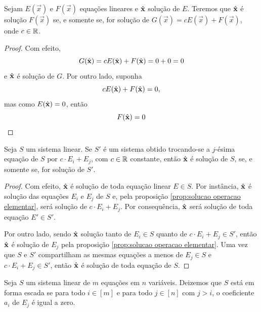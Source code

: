 \begin{prop:solucao operacao elementar}
\label{prop:solucao operacao elementar}
Sejam $E(\vec x)$ e $F(\vec x)$ equações lineares e $\hat{\mathbf{x}}$ solução de $E$.
Teremos que $\hat{\mathbf{x}}$ é solução $F(\vec x)$ se, e somente se, for solução de
$G(\vec x) = cE(\vec x) + F(\vec x)$, onde $c \in \mathbb{R}$.
\end{prop:solucao operacao elementar}
\begin{proof}
	Com efeito,
	\[
		G(\hat{\mathbf{x}}) = c E(\hat{\mathbf{x}}) + F(\hat{\mathbf{x}}) = 0 + 0 = 0
	\]
	e $\hat{\mathbf{x}}$ é solução de $G$.
	Por outro lado, suponha
	\[
		c E(\hat{\mathbf{x}}) + F(\hat{\mathbf{x}}) = 0,
	\]
	mas como $E(\hat{\mathbf{x}}) = 0$, então
	\[
		F(\hat{\mathbf{x}}) = 0
	\]
\end{proof}

\begin{cor:sistema equivalente}
Seja $S$ um sistema linear.
Se $S'$ é um sistema obtido trocando-se a $j$-ésima equação de $S$ por
$c \cdot E_i + E_j$, com $c \in \mathbb{R}$ constante, então $\hat{\mathbf{x}}$ é solução de $S$,
se, e somente se, for solução de $S'$.
\end{cor:sistema equivalente}
\begin{proof}
	Com efeito, $\hat{\mathbf{x}}$ é solução de toda equação linear $E \in S$.
	Por instância, $\hat{\mathbf{x}}$ é solução das equações $E_i$ e $E_j$ de $S$ e, pela
	proposição \ref{prop:solucao operacao elementar}, será solução de $c \cdot E_i + E_j$.
	Por consequência, $\hat{\mathbf{x}}$ será solução de toda equação $E' \in S'$.

	Por outro lado, sendo $\hat{\mathbf{x}}$ solução tanto de $E_i \in S$ quanto de
	$c \cdot E_i + E_j \in S'$, então $\hat{\mathbf{x}}$ é solução de $E_j$ pela
	proposição \ref{prop:solucao operacao elementar}.
	Uma vez que $S$ e $S'$ compartilham as mesmas equações a menos de $E_j \in S$ e
	$c \cdot E_i + E_j \in S'$, então $\hat{\mathbf{x}}$ é solução de toda equação de $S$.
\end{proof}

\begin{def:forma escada}
Seja $S$ um sistema linear de $m$ equações em $n$ variáveis.
Deizemos que $S$ está em forma escada se para todo $i \in [m]$ e para todo $j \in [n]$ com
$j > i$, o coeficiente $a_i$ de $E_j$ é igual a zero.
\end{def:forma escada}
